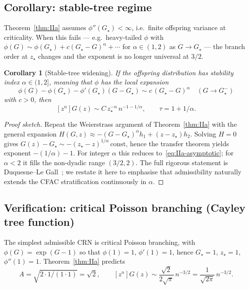 \documentclass[11pt,a4paper]{article}
\theoremstyle{plain}
\newtheorem{corollary}[theorem]{Corollary}
\theoremstyle{definition}
\begin{document}
\subsection{Corollary: stable-tree regime}

Theorem~\ref{thm:IIa} assumes $\phi''(G_\star) < \infty$, i.e.\ finite
offspring variance at criticality.  When this fails ---
e.g.\ heavy-tailed $\phi$ with $\phi(G) \sim \phi(G_\star) + c(G_\star - G)^\alpha
+ \cdots$ for $\alpha \in (1, 2)$ as $G \to G_\star$ --- the branch
order at $z_\star$ changes and the exponent is no longer universal at
$3/2$.

\begin{corollary}[Stable-tree widening]
\label{cor:stable-tree}
If the offspring distribution has stability index $\alpha \in (1, 2]$,
meaning that $\phi$ has the local expansion
\[
  \phi(G) - \phi(G_\star) - \phi'(G_\star)(G - G_\star)
  \sim c\,(G_\star - G)^\alpha \quad (G \to G_\star^-)
\]
with $c > 0$, then
\begin{equation}
\label{eq:stable-tree-tau}
  [z^n] G(z) \sim C\, z_\star^{-n}\, n^{-1 - 1/\alpha}, \qquad \tau = 1 + 1/\alpha.
\end{equation}
\end{corollary}

\begin{proof}[Proof sketch]
Repeat the Weierstrass argument of Theorem~\ref{thm:IIa} with the
general expansion $H(G, z) \approx -(G - G_\star)^\alpha h_1 + (z - z_\star) h_2$.
Solving $H = 0$ gives
$G(z) - G_\star \sim -(z_\star - z)^{1/\alpha}\,\text{const}$, hence the
transfer theorem yields exponent $-(1/\alpha) - 1$.  For integer
$\alpha$ this reduces to~\eqref{eq:IIa-asymptotic}; for $\alpha < 2$
it fills the non-dyadic range $(3/2, 2)$.  The full rigorous
statement is Duquesne--Le Gall~\citep{DuquesneLeGall2002};
we restate it here to emphasise that admissibility naturally extends
the CFAC stratification continuously in $\alpha$.
\end{proof}

\subsection{Verification: critical Poisson branching (Cayley tree function)}
\label{sec:IIa-verify}

The simplest admissible CRN is critical Poisson branching, with
$\phi(G) = \exp(G - 1)$ so that $\phi(1) = 1$, $\phi'(1) = 1$, hence
$G_\star = 1$, $z_\star = 1$, $\phi''(1) = 1$.
Theorem~\ref{thm:IIa} predicts
\[
  A = \sqrt{2 \cdot 1 / (1 \cdot 1)} = \sqrt{2},
  \qquad
  [z^n] G(z) \sim \frac{\sqrt{2}}{2\sqrt{\pi}}\, n^{-3/2} = \frac{1}{\sqrt{2\pi}}\, n^{-3/2}.
\]
\end{document}
